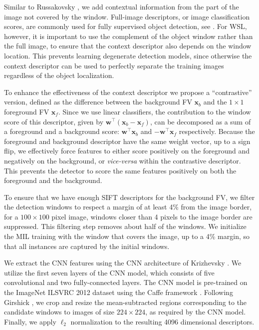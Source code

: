 \documentclass[10pt,journal,cspaper,final,twocolumn,compsoc]{./IEEEtran}
\begin{document}
Similar to Russakovsky \etal\cite{russakovsky12eccv}, we
add contextual information from the part of the image not
covered by the window. Full-image descriptors, or image
classification scores, are commonly used for fully
supervised object detection, see \eg\cite{cinbis13iccv,song2011cvpr}.  For WSL, however, it is
important to use the complement of the object window
rather than the full image, to ensure that the context
descriptor also depends on the window location. This
prevents learning degenerate detection models, since otherwise the context descriptor can be used
to perfectly separate the training images regardless of
the object localization.

To enhance the effectiveness of the context descriptor we
propose a ``contrastive'' version, defined as the
difference between the background FV $\bm x_b$ and the
$1\times 1$ foreground FV $\bm x_f$.  Since we use linear
classifiers, the contribution to the window score of this
descriptor, given by $\bm w^\top(\bm x_b-\bm x_f)$, can be
decomposed as a sum of a foreground and a background
score: $\bm w^\top \bm x_b$ and   $-\bm w^\top \bm x_f$
respectively.  Because the foreground and background
descriptor have the same weight vector, up to a sign flip,
we effectively  force features to either score positively
on the foreground and negatively on the background, or
\emph{vice-versa} within the contrastive descriptor. This prevents the detector to score the
same features positively on both the foreground and the
background.

To ensure that we have enough SIFT descriptors for the
background FV, we filter the detection windows to respect
a margin of at least 4\% from the image border, \ie for a
$100\times 100$ pixel image, windows closer than 4 pixels
to the image border are suppressed.  This filtering step
removes about half of the windows.  We initialize the MIL
training with the window that covers the image, up to a
4\% margin, so that all instances are captured by the
initial windows.

We extract the CNN features using the CNN architecture of
Krizhevsky \etal\cite{krizhevsky12nips}.  We utilize the
first seven layers of the CNN model, which consists of
five convolutional and two fully-connected layers.  The
CNN model is pre-trained on the ImageNet ILSVRC 2012
dataset using the Caffe framework \cite{jia14caffe}.
Following Girshick \etal\cite{girshick14cvpr}, we crop
and resize the mean-subtracted regions corresponding to the
candidate windows to images of size $224\times224$, as
required by the CNN model. Finally, we apply $\ell_2$
normalization to the resulting 4096 dimensional 
descriptors.
\end{document}
